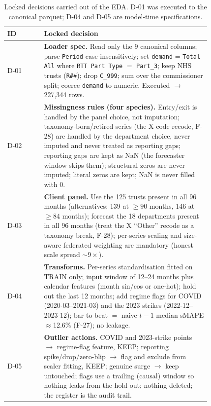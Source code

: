 \documentclass[11pt,a4paper]{article}
\begin{document}
\begin{table}[H]
\centering
\caption{Locked decisions carried out of the EDA. D-01 was executed to the canonical parquet; D-04 and D-05 are model-time specifications.}
\label{tab:decisions}
\small
\begin{tabular}{@{}l p{0.82\linewidth}@{}}
\toprule
ID & Locked decision \\
\midrule
D-01 & \textbf{Loader spec.} Read only the 9 canonical columns; parse \texttt{Period} case-insensitively; set \texttt{demand} = \texttt{Total All} where \texttt{RTT Part Type} $=$ \texttt{Part\_3}; keep NHS trusts (\texttt{R\#\#}); drop \texttt{C\_999}; sum over the commissioner split; coerce \texttt{demand} to numeric. Executed $\rightarrow$ 227,344 rows. \\
D-02 & \textbf{Missingness rules (four species).} Entry/exit is handled by the panel choice, not imputation; taxonomy-born/retired series (the X-code recode, F-28) are handled by the department choice, never imputed and never treated as reporting gaps; reporting gaps are kept as NaN (the forecaster window skips them); structural zeros are never imputed; literal zeros are kept; NaN is never filled with 0. \\
D-03 & \textbf{Client panel.} Use the 125 trusts present in all 96 months (alternatives: 139 at $\geq 90$ months, 146 at $\geq 84$ months); forecast the 18 departments present in all 96 months (treat the X ``Other'' recode as a taxonomy break, F-28); per-series scaling and size-aware federated weighting are mandatory (honest scale spread $\sim$$9\times$). \\
D-04 & \textbf{Transforms.} Per-series standardisation fitted on TRAIN only; input window of 12--24 months plus calendar features (month sin/cos or one-hot); hold out the last 12 months; add regime flags for COVID (2020-03--2021-03) and the 2023 strikes (2022-12--2023-12); bar to beat $=$ naive-$t-1$ median sMAPE $\approx$12.6\% (F-27); no leakage. \\
D-05 & \textbf{Outlier actions.} COVID and 2023-strike points $\rightarrow$ regime-flag feature, KEEP; reporting spike/drop/zero-blip $\rightarrow$ flag and exclude from scaler fitting, KEEP; genuine surge $\rightarrow$ keep untouched; flags use a trailing (causal) window so nothing leaks from the hold-out; nothing deleted; the register is the audit trail. \\
\bottomrule
\end{tabular}
\end{table}
\end{document}
